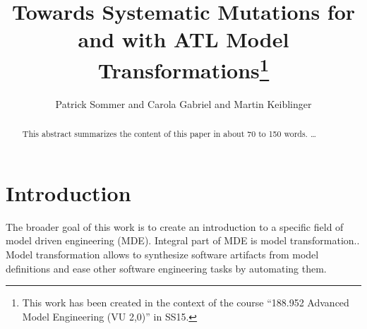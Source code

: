 \documentclass{llncs}
\begin{document}
\pagestyle{plain}

\title{Towards Systematic Mutations for and with ATL Model Transformations\footnote{This work has been created in the context of the course ``188.952 Advanced Model Engineering (VU 2,0)'' in SS15.}}


\author{Patrick Sommer and Carola Gabriel and Martin Keiblinger}


\maketitle

\begin{abstract}

This abstract summarizes the content of this paper in about 70 to 150 words. \dots
\end{abstract}

\tableofcontents
\newpage


\section{Introduction}

The broader goal of this work is to create an introduction to a specific field of model driven engineering (MDE). Integral part of MDE is model transformation.\cite{Sendall:2003}. Model transformation allows to synthesize software artifacts from model definitions and ease other software engineering tasks by automating them.
\end{document}
